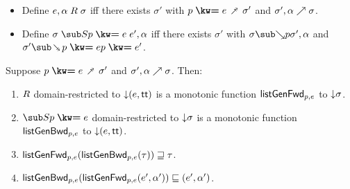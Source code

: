 \begin{lemma}
  \label{lem:aux:list-gen:gc}
  \item
  \begin{itemize}
    \item Define $e, \alpha \mathrel{R} \sigma $ iff there exists $\sigma'$ with $\clauseUncurried{p}{e} \desugarClauseFwd \sigma'$ and ${\sigma'},{\alpha} \nearrow {\sigma}$.
    \item Define $\sigma \listGenBwd{\clauseUncurried{p}{e}} e', \alpha$ iff there exists $\sigma'$ with $\totalisebwd{\sigma}{p}{\sigma'}{\alpha}$ and $\sigma' \desugarClauseBwd{\clauseUncurried{p}{e}} \clauseUncurried{p}{e'}$.
  \end{itemize}
  Suppose $\clauseUncurried{p}{e} \desugarClauseFwd \sigma'$ and ${\sigma'},{\alpha} \nearrow {\sigma}$. Then:
  \begin{enumerate}
     \item $\mathrel{R}$ domain-restricted to ${\downarrow}{(e, \mathsf{tt})}$ is a monotonic function $\mathsf{listGenFwd}_{p, e}$ to ${\downarrow}{\sigma}$.
     \item $\listGenBwd{\clauseUncurried{p}{e}}$ domain-restricted to ${\downarrow}{\sigma}$ is a monotonic function $\mathsf{listGenBwd}_{p, e}$ to ${\downarrow}{(e, \mathsf{tt})}$.
     \item $\mathsf{listGenFwd}_{p, e}(\mathsf{listGenBwd}_{p, e}(\tau)) \sqsupseteq \tau$.
     \item $\mathsf{listGenBwd}_{p, e}(\mathsf{listGenFwd}_{p, e}(e', \alpha')) \sqsubseteq (e', \alpha')$.
  \end{enumerate}
\end{lemma}
